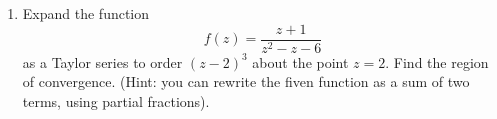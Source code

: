 \documentclass[fleqn]{article}
\begin{document}
\begin{enumerate}
      \textcolor{hwColor}{
        $
          f(z)=f(z_0)+f^'(z_0)(z-z_0)+\dfrac{f^{''}(z_0)}{2!} (z-z_0)^2+\dfrac{f^{'''}(z_0)}{3!} (z-z_0)^3+... \\
          \\
          \\
          =f(1)+f^'(1)(z-1)+\dfrac{f^{''}(1)}{2!} (z-1)^2+\dfrac{f^{'''}(1)}{3!} (z-1)^3+... \\ 
          \\
          \\
          =\dfrac{1}{2}-\dfrac{1}{4}(z-1)+\dfrac{\dfrac{2}{2^3}}{2!} (z-1)^2-\dfrac{\dfrac{6}{2^4}}{3!} (z-1)^3 \\
          \\
          \\
          \\
          \therefore ~~~ f(z)=\sum\limits_{n=0}^{\infty} \left(-\dfrac{1}{2}\right)^n (z-1)^n \\
          \\
          \\
          \\
          \dfrac{1}{R}=\lim\limits_{n \to \infty} |\dfrac{a_{n+1}}{a_n}|=\lim\limits_{n \to \infty} \Big|\dfrac{(-\dfrac{1}{2})^n+1}{(-\dfrac{1}{2})^n}\Big| \\
          \\
          \\
          \therefore ~~~ R=2  \\
        $
        \\
        The region of convergence is inside a circle centered a $1$ with a radius of $2$.
      }

    \item Expand the function
    $$f(z) = \frac{z + 1}{z^2 - z - 6}$$
    as a Taylor series to order $(z - 2)^3$ about the point $z = 2$. Find the region of convergence. (Hint: you can rewrite the fiven function as a sum of two terms, using partial fractions). 

  \end{enumerate}
\end{document}

